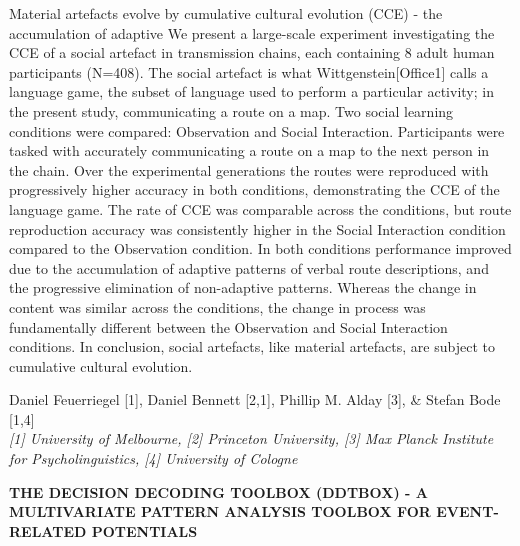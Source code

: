 \documentclass[]{article}
\begin{document}
Material artefacts evolve by cumulative cultural evolution (CCE) - the
accumulation of adaptive We present a large-scale experiment
investigating the CCE of a social artefact in transmission chains, each
containing 8 adult human participants (N=408). The social artefact is
what Wittgenstein{[}Office1{]} calls a language game, the subset of
language used to perform a particular activity; in the present study,
communicating a route on a map. Two social learning conditions were
compared: Observation and Social Interaction. Participants were tasked
with accurately communicating a route on a map to the next person in the
chain. Over the experimental generations the routes were reproduced with
progressively higher accuracy in both conditions, demonstrating the CCE
of the language game. The rate of CCE was comparable across the
conditions, but route reproduction accuracy was consistently higher in
the Social Interaction condition compared to the Observation condition.
In both conditions performance improved due to the accumulation of
adaptive patterns of verbal route descriptions, and the progressive
elimination of non-adaptive patterns. Whereas the change in content was
similar across the conditions, the change in process was fundamentally
different between the Observation and Social Interaction conditions. In
conclusion, social artefacts, like material artefacts, are subject to
cumulative cultural evolution.\\
\pagebreak  

Daniel Feuerriegel {[}1{]}, Daniel Bennett {[}2,1{]}, Phillip M. Alday
{[}3{]}, \& Stefan Bode {[}1,4{]}\\
\emph{{[}1{]} University of Melbourne, {[}2{]} Princeton University,
{[}3{]} Max Planck Institute for Psycholinguistics, {[}4{]} University
of Cologne}

\textbf{THE DECISION DECODING TOOLBOX (DDTBOX) - A MULTIVARIATE PATTERN
ANALYSIS TOOLBOX FOR EVENT-RELATED POTENTIALS}
\end{document}
